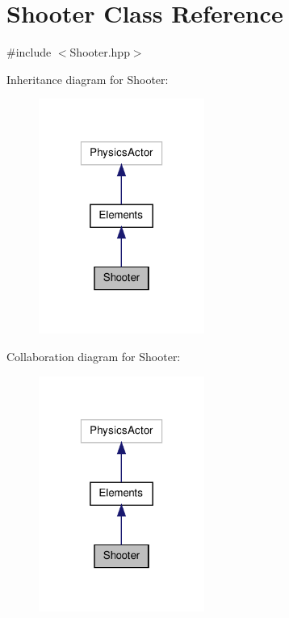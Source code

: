 \hypertarget{class_shooter}{\section{Shooter Class Reference}
\label{class_shooter}
}


{\ttfamily \#include $<$Shooter.\-hpp$>$}



Inheritance diagram for Shooter\-:\nopagebreak
\begin{figure}[H]
\begin{center}
\leavevmode
\includegraphics[width=154pt]{class_shooter__inherit__graph}
\end{center}
\end{figure}


Collaboration diagram for Shooter\-:\nopagebreak
\begin{figure}[H]
\begin{center}
\leavevmode
\includegraphics[width=154pt]{class_shooter__coll__graph}
\end{center}
\end{figure}
